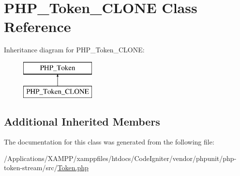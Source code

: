 \hypertarget{class_p_h_p___token___c_l_o_n_e}{}\section{P\+H\+P\+\_\+\+Token\+\_\+\+C\+L\+O\+NE Class Reference}
\label{class_p_h_p___token___c_l_o_n_e}
Inheritance diagram for P\+H\+P\+\_\+\+Token\+\_\+\+C\+L\+O\+NE\+:\begin{figure}[H]
\begin{center}
\leavevmode
\includegraphics[height=2.000000cm]{class_p_h_p___token___c_l_o_n_e}
\end{center}
\end{figure}
\subsection*{Additional Inherited Members}


The documentation for this class was generated from the following file\+:\begin{DoxyCompactItemize}
\item 
/\+Applications/\+X\+A\+M\+P\+P/xamppfiles/htdocs/\+Code\+Igniter/vendor/phpunit/php-\/token-\/stream/src/\mbox{\hyperlink{_token_8php}{Token.\+php}}\end{DoxyCompactItemize}
